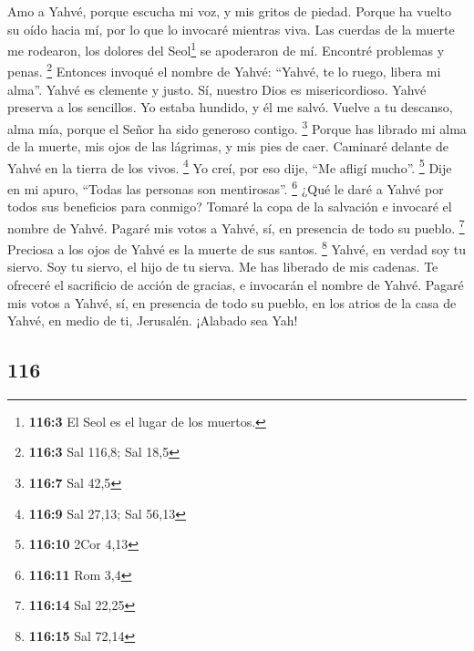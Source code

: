 \begin{paracol}{2}
 Amo a Yahvé, porque escucha mi voz, y mis gritos de
piedad.  Porque ha vuelto su oído hacia mí, por lo que lo
invocaré mientras viva.  Las cuerdas de la muerte me
rodearon, los dolores del Seol\footnote{\textbf{116:3} El Seol es el
  lugar de los muertos.} se apoderaron de mí. Encontré problemas y
penas. \footnote{\textbf{116:3} Sal 116,8; Sal 18,5} 
Entonces invoqué el nombre de Yahvé: ``Yahvé, te lo ruego, libera mi
alma''.  Yahvé es clemente y justo. Sí, nuestro Dios es
misericordioso.  Yahvé preserva a los sencillos. Yo estaba
hundido, y él me salvó.  Vuelve a tu descanso, alma mía,
porque el Señor ha sido generoso contigo. \footnote{\textbf{116:7} Sal
  42,5}  Porque has librado mi alma de la muerte, mis ojos
de las lágrimas, y mis pies de caer.  Caminaré delante de
Yahvé en la tierra de los vivos. \footnote{\textbf{116:9} Sal 27,13; Sal
  56,13}  Yo creí, por eso dije, ``Me afligí mucho''.
\footnote{\textbf{116:10} 2Cor 4,13}  Dije en mi apuro,
``Todas las personas son mentirosas''. \footnote{\textbf{116:11} Rom 3,4}
 ¿Qué le daré a Yahvé por todos sus beneficios para
conmigo?  Tomaré la copa de la salvación e invocaré el
nombre de Yahvé.  Pagaré mis votos a Yahvé, sí, en
presencia de todo su pueblo. \footnote{\textbf{116:14} Sal 22,25}
 Preciosa a los ojos de Yahvé es la muerte de sus santos.
\footnote{\textbf{116:15} Sal 72,14}  Yahvé, en verdad
soy tu siervo. Soy tu siervo, el hijo de tu sierva. Me has liberado de
mis cadenas.  Te ofreceré el sacrificio de acción de
gracias, e invocarán el nombre de Yahvé.  Pagaré mis
votos a Yahvé, sí, en presencia de todo su pueblo,  en
los atrios de la casa de Yahvé, en medio de ti, Jerusalén. ¡Alabado sea
Yah!

\switchcolumn
\begin{otherlanguage}{english}

\hypertarget{section-231}{%
\section{116}\label{section-231}}


\end{otherlanguage}
\end{paracol}
